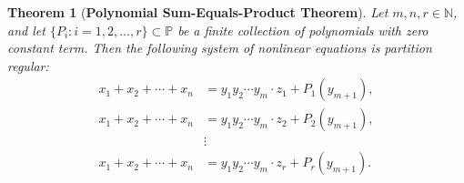 \documentclass{article}
\theoremstyle{Theorem}
\newtheorem{thm}{Theorem}[section]
\theoremstyle{definition}
\newcommand{\Z}{\mathbb{Z}}
\newcommand{\Po}{\mathbb{P}}
\begin{document}
\begin{thm}[\textbf{Polynomial Sum-Equals-Product Theorem}]\label{task3}
    Let \( m, n, r \in \mathbb{N} \), and let \( \{P_i : i = 1, 2, \ldots, r\} \subset \Po \) be a finite collection of polynomials with zero constant term. Then the following system of nonlinear equations is partition regular:
    \begin{align*}
        x_1 + x_2 + \cdots + x_n &= y_1 y_2 \cdots y_m \cdot z_1 + P_1(y_{m+1}), \\
        x_1 + x_2 + \cdots + x_n &= y_1 y_2 \cdots y_m \cdot z_2 + P_2(y_{m+1}), \\
        &\vdots \\
        x_1 + x_2 + \cdots + x_n &= y_1 y_2 \cdots y_m \cdot z_r + P_r(y_{m+1}).
    \end{align*}
\end{thm}

\end{document}
